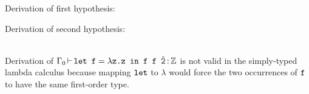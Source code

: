 \documentclass{amsart}
\begin{document}
\begin{solution}
  Derivation of first hypothesis:
  \begin{prooftree}
  \end{prooftree}

  Derivation of second hypothesis:
  \begin{prooftree}
  \end{prooftree}
  \ \\

  \noindent
  Derivation of \(\Gamma_0 \entails \mono{let f} = \lambda \mono{z.z}
    \mono{ in f f } \hat{\mono{2}} \inhabits \mathbb{Z}\)
  is not valid in the simply-typed lambda calculus because mapping
  \(\mono{let}\) to \(\lambda\) would force the two occurrences of \(\mono{f}\)
  to have the same first-order type.


\end{solution}
\end{document}
